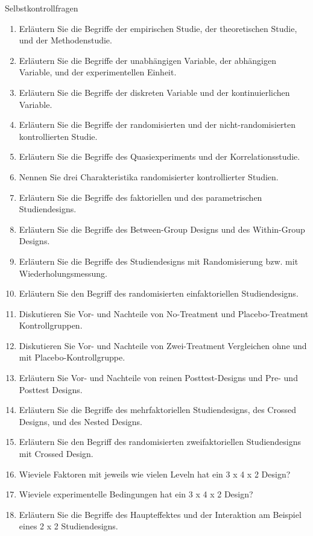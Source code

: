\documentclass[
  8pt,
  ignorenonframetext,
]{beamer}
\providecommand{\tightlist}{%
  \setlength{\itemsep}{0pt}\setlength{\parskip}{0pt}}
\begin{document}
\begin{frame}{Selbstkontrollfragen}
\protect\hypertarget{selbstkontrollfragen}{}
\footnotesize
{}

\begin{enumerate}
\tightlist
\item
  Erläutern Sie die Begriffe der empirischen Studie, der theoretischen
  Studie, und der Methodenstudie.
\item
  Erläutern Sie die Begriffe der unabhängigen Variable, der abhängigen
  Variable, und der experimentellen Einheit.
\item
  Erläutern Sie die Begriffe der diskreten Variable und der
  kontinuierlichen Variable.
\item
  Erläutern Sie die Begriffe der randomisierten und der
  nicht-randomisierten kontrollierten Studie.
\item
  Erläutern Sie die Begriffe des Quasiexperiments und der
  Korrelationsstudie.
\item
  Nennen Sie drei Charakteristika randomisierter kontrollierter Studien.
\item
  Erläutern Sie die Begriffe des faktoriellen und des parametrischen
  Studiendesigns.
\item
  Erläutern Sie die Begriffe des Between-Group Designs und des
  Within-Group Designs.
\item
  Erläutern Sie die Begriffe des Studiendesigns mit Randomisierung bzw.
  mit Wiederholungsmessung.
\item
  Erläutern Sie den Begriff des randomisierten einfaktoriellen
  Studiendesigns.
\item
  Diskutieren Sie Vor- und Nachteile von No-Treatment und
  Placebo-Treatment Kontrollgruppen.
\item
  Diskutieren Sie Vor- und Nachteile von Zwei-Treatment Vergleichen ohne
  und mit Placebo-Kontrollgruppe.
\item
  Erläutern Sie Vor- und Nachteile von reinen Posttest-Designs und Pre-
  und Posttest Designs.
\item
  Erläutern Sie die Begriffe des mehrfaktoriellen Studiendesigns, des
  Crossed Designs, und des Nested Designs.
\item
  Erläutern Sie den Begriff des randomisierten zweifaktoriellen
  Studiendesigns mit Crossed Design.
\item
  Wieviele Faktoren mit jeweils wie vielen Leveln hat ein 3 x 4 x 2
  Design?
\item
  Wieviele experimentelle Bedingungen hat ein 3 x 4 x 2 Design?
\item
  Erläutern Sie die Begriffe des Haupteffektes und der Interaktion am
  Beispiel eines 2 x 2 Studiendesigns.
\end{enumerate}
\end{frame}
\end{document}
